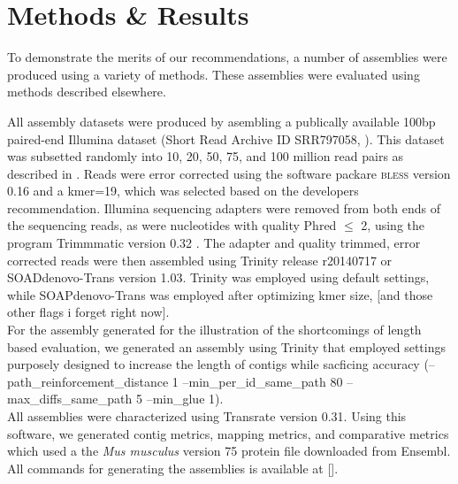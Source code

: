 \section*{Methods & Results}

To demonstrate the merits of our recommendations, a number of assemblies were produced using a variety of methods. These assemblies were evaluated using methods described elsewhere. 

All assembly datasets were produced by asembling a publically available 100bp paired-end Illumina dataset (Short Read Archive ID SRR797058, \citep{Macfarlan:2012js}). This dataset was subsetted randomly into 10, 20, 50, 75, and 100 million read pairs as described in \citep{MacManes:2014io}. Reads were error corrected using the software packare \textsc{bless} version 0.16 \citep{Heo:2014cb} and a kmer=19, which was selected based on the developers recommendation.  Illumina sequencing adapters were removed from both ends of the sequencing reads, as were nucleotides with quality Phred $\leq$ 2, using the program Trimmmatic version 0.32 \citep{Bolger:2014ek}. The adapter and quality trimmed, error corrected reads were then assembled using Trinity release r20140717 or SOADdenovo-Trans version 1.03. Trinity was employed using default settings, while SOAPdenovo-Trans was employed after optimizing kmer size, [and those other flags i forget right now]. \\

For the assembly generated for the illustration of the shortcomings of length based evaluation, we generated an assembly using Trinity that employed settings purposely designed to increase the length of contigs while sacficing accuracy (--path_reinforcement_distance 1 --min_per_id_same_path 80  --max_diffs_same_path 5 --min_glue 1). \\

All assemblies were characterized using Transrate version 0.31. Using this software, we generated contig metrics, mapping metrics, and comparative metrics which used a the \textit{Mus musculus} version 75 protein file downloaded from Ensembl. All commands for generating the assemblies is available at [].  